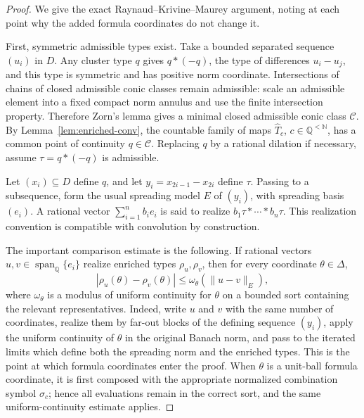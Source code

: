 \documentclass[11pt]{article}
\newcommand{\N}{\mathbb{N}}
\newcommand{\Q}{\mathbb{Q}}
\newcommand{\Span}{\operatorname{span}}
\newcommand{\C}{\mathcal{C}}
\begin{document}
\begin{proof}
We give the exact Raynaud--Krivine--Maurey argument, noting at each point why
the added formula coordinates do not change it.

First, symmetric admissible types exist. Take a bounded separated sequence
\((u_i)\) in \(D\). Any cluster type \(q\) gives
\(q*(-q)\), the type of differences \(u_i-u_j\), and this type is symmetric
and has positive norm coordinate. Intersections of chains of closed
admissible conic classes remain admissible: scale an admissible element into
a fixed compact norm annulus and use the finite intersection property.
Therefore Zorn's lemma gives a minimal closed admissible conic class
\(\C\). By Lemma~\ref{lem:enriched-conv}, the countable family of maps
\(\widehat T_c\), \(c\in\Q^{<\N}\), has a common point of continuity
\(q\in\C\). Replacing \(q\) by a rational dilation if necessary, assume
\(\tau=q*(-q)\) is admissible.

Let \((x_i)\subseteq D\) define \(q\), and let
\(y_i=x_{2i-1}-x_{2i}\) define \(\tau\). Passing to a subsequence, form the
usual spreading model \(E\) of \((y_i)\), with spreading basis
\((e_i)\). A rational vector
\(\sum_{i=1}^n b_i e_i\) is said to realize
\(b_1\tau*\cdots*b_n\tau\). This realization convention is compatible with
convolution by construction.

The important comparison estimate is the following. If rational vectors
\(u,v\in\Span_\Q\{e_i\}\) realize enriched types \(\rho_u,\rho_v\), then for
every coordinate \(\theta\in\Delta\),
\[
  |\rho_u(\theta)-\rho_v(\theta)|
  \le \omega_\theta(\|u-v\|_E),
  \tag{3}
\]
where \(\omega_\theta\) is a modulus of uniform continuity for \(\theta\) on
a bounded sort containing the relevant representatives. Indeed, write \(u\)
and \(v\) with the same number of coordinates, realize them by far-out
blocks of the defining sequence \((y_i)\), apply the uniform continuity of
\(\theta\) in the original Banach norm, and pass to the iterated limits which
define both the spreading norm and the enriched types. This is the point at
which formula coordinates enter the proof. When \(\theta\) is a unit-ball
formula coordinate, it is first composed with the appropriate normalized
combination symbol \(\sigma_c\); hence all evaluations remain in the correct
sort, and the same uniform-continuity estimate applies.


\end{proof}
\end{document}
